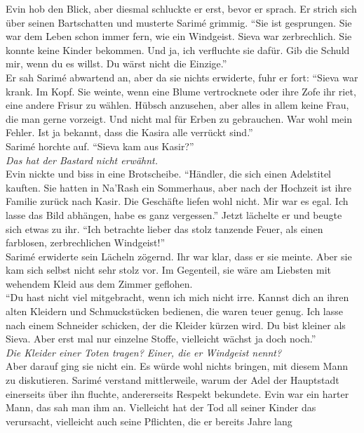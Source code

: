 Evin hob den Blick, aber diesmal schluckte er erst, bevor er sprach. Er strich sich über seinen 
Bartschatten und musterte Sarimé grimmig. ``Sie ist gesprungen. Sie war dem Leben schon immer fern, 
wie ein Windgeist. Sieva war zerbrechlich. Sie konnte keine Kinder bekommen. Und ja, ich verfluchte 
sie dafür. Gib die Schuld mir, wenn du es willst. Du wärst nicht die Einzige.''\\
Er sah Sarimé abwartend an, aber da sie nichts erwiderte, fuhr er fort: ``Sieva war krank. Im 
Kopf. Sie weinte, wenn eine Blume vertrocknete oder ihre Zofe ihr riet, eine andere Frisur zu 
wählen. Hübsch anzusehen, aber alles in allem keine Frau, die man gerne vorzeigt. Und nicht mal für 
Erben zu gebrauchen. War wohl mein Fehler. Ist ja bekannt, dass die Kasira alle verrückt sind.''\\
Sarimé horchte auf. ``Sieva kam aus Kasir?''\\
\textit{Das hat der Bastard nicht erwähnt.}\\
Evin nickte und biss in eine Brotscheibe. ``Händler, die sich einen Adelstitel kauften. Sie hatten 
in Na'Rash ein Sommerhaus, aber nach der Hochzeit ist ihre Familie zurück nach Kasir. Die Geschäfte 
liefen wohl nicht. Mir war es egal. Ich lasse das Bild abhängen, habe es ganz vergessen.'' Jetzt 
lächelte er und beugte sich etwas zu ihr. ``Ich betrachte lieber das stolz tanzende Feuer, als 
einen farblosen, zerbrechlichen Windgeist!''\\
Sarimé erwiderte sein Lächeln zögernd. Ihr war klar, dass er sie meinte. Aber sie kam sich selbst 
nicht sehr stolz vor. Im Gegenteil, sie wäre am Liebsten mit wehendem Kleid aus dem Zimmer 
geflohen. \\
``Du hast nicht viel mitgebracht, wenn ich mich nicht irre. Kannst dich an ihren alten Kleidern und 
Schmuckstücken bedienen, die waren teuer genug. Ich lasse nach einem Schneider schicken, der die 
Kleider kürzen wird. Du bist kleiner als Sieva. Aber erst mal nur einzelne Stoffe, vielleicht 
wächst ja doch noch.''\\
\textit{Die Kleider einer Toten tragen? Einer, die er Windgeist nennt?}\\
Aber darauf ging sie nicht ein. Es würde wohl nichts bringen, mit diesem Mann zu diskutieren. 
Sarimé verstand mittlerweile, warum der Adel der Hauptstadt einerseits über ihn fluchte, 
andererseits Respekt bekundete. Evin war ein harter Mann, das sah man ihm an. Vielleicht hat der 
Tod all seiner Kinder das verursacht, vielleicht auch seine Pflichten, die er bereits Jahre lang 
